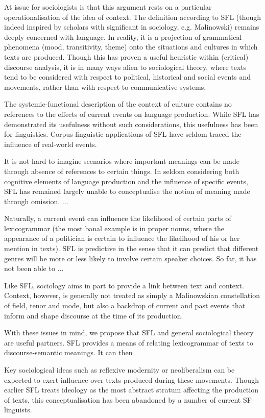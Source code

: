             At issue for sociologists is that this argument rests on a particular operationalisation of the idea of context. The definition according to SFL (though indeed inspired by scholars with significant in sociology, e.g. Malinowski) remains deeply concerned with language. In reality, it is a projection of grammatical phenomena (mood, transitivity, theme) onto the situations and cultures in which texts are produced. Though this has proven a useful heuristic within (critical) discourse analysis, it is in many ways alien to sociological theory, where texts tend to be considered with respect to political, historical and social events and movements, rather than with respect to communicative systems.

	The systemic-functional description of the context of culture contains no references to the effects of current events on language production. While SFL has demonstrated its usefulness without such considerations, this usefulness has been for linguistics. Corpus linguistic applications of SFL have seldom traced the influence of real-world events.

            It is not hard to imagine scenarios where important meanings can be made through absence of references to certain things. In seldom considering both cognitive elements of language production and the influence of specific events, SFL has remained largely unable to conceptualise the notion of meaning made through omission. ...

            Naturally, a current event can influence the likelihood of certain parts of lexicogrammar (the most banal example is in proper nouns, where the appearance of a politician is certain to influence the likelihood of his or her mention in texts).  SFL is predictive in the sense that it can predict that different genres will be more or less likely to involve certain speaker choices. So far, it has not been able to ...

	Like SFL, sociology aims in part to provide a link between text and context. Context, however, is generally not treated as simply a Malinowskian constellation of field, tenor and mode, but also a backdrop of current and past events that inform and shape discourse at the time of its production.

	With these issues in mind, we propose that SFL and general sociological theory are useful partners. SFL provides a means of relating lexicogrammar of texts to discourse-semantic meanings. It can then 

            Key sociological ideas such as reflexive modernity or neoliberalism can be expected to exert influence over texts produced during these movements. Though earlier SFL treats ideology as the most abstract stratum affecting the production of texts, this conceptualisation has been abandoned by a number of current SF linguists.

